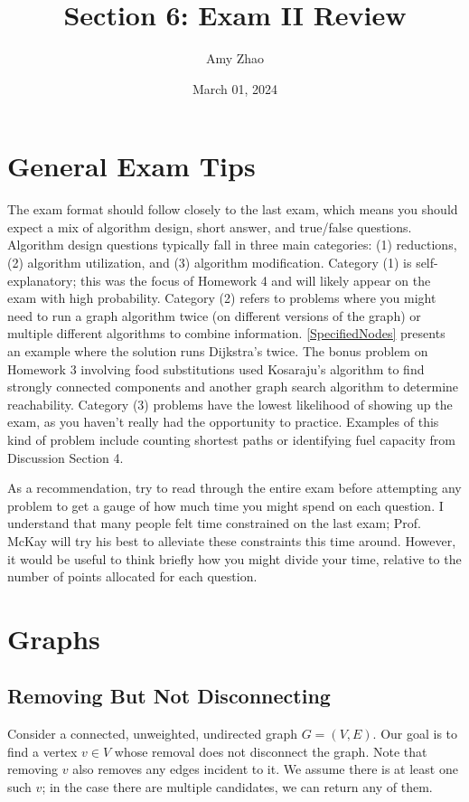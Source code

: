 \documentclass[11pt]{article}
\title{Section 6: Exam II Review}
\date{March 01, 2024}
\author{Amy Zhao}
\begin{document}
\renewcommand\labelitemi{$\vcenter{\hbox{\tiny$\bullet$}}$}
\renewcommand\labelitemii{$\vcenter{\hbox{\tiny$\bullet$}}$}


\maketitle

\section{General Exam Tips}
The exam format should follow closely to the last exam, which means you should expect a mix of algorithm design, short answer, and true/false questions. Algorithm design questions typically fall in three main categories: (1) reductions, (2) algorithm utilization, and (3) algorithm modification. Category (1) is self-explanatory; this was the focus of Homework 4 and will likely appear on the exam with high probability. Category (2) refers to problems where you might need to run a graph algorithm twice (on different versions of the graph) or multiple different algorithms to combine information. \cref{SpecifiedNodes} presents an example where the solution runs Dijkstra's twice. The bonus problem on Homework 3 involving food substitutions used Kosaraju's algorithm to find strongly connected components and another graph search algorithm to determine reachability. Category (3) problems have the lowest likelihood of showing up the exam, as you haven't really had the opportunity to practice. Examples of this kind of problem include counting shortest paths or identifying fuel capacity from Discussion Section 4. 

As a recommendation, try to read through the entire exam before attempting any problem to get a gauge of how much time you might spend on each question. I understand that many people felt time constrained on the last exam; Prof. McKay will try his best to alleviate these constraints this time around. However, it would be useful to think briefly how you might divide your time, relative to the number of points allocated for each question.

\section{Graphs}
\subsection{Removing But Not Disconnecting}
Consider a connected, unweighted, undirected graph $G = (V, E)$. Our goal is to find a vertex $v \in V$ whose removal does not disconnect the graph. Note that removing $v$ also removes any edges incident to it. We assume there is at least one such $v$; in the case there are multiple candidates, we can return any of them. 
\end{document}
